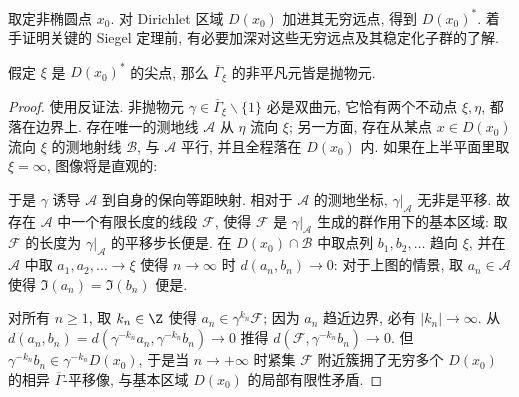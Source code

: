 取定非椭圆点 $x_0$. 对 Dirichlet 区域 $D(x_0)$ 加进其无穷远点, 得到 $D(x_0)^*$. 着手证明关键的 Siegel 定理前, 有必要加深对这些无穷远点及其稳定化子群的了解.
\begin{lemma}\label{prop:parabolic-stabilizer-aux}
	假定 $\xi$ 是 $D(x_0)^*$ 的尖点, 那么 $\overline{\Gamma}_\xi$ 的非平凡元皆是抛物元.
\end{lemma}
\begin{proof}
	使用反证法. 非抛物元 $\gamma \in \overline{\Gamma}_\xi \smallsetminus \{1\}$ 必是双曲元, 它恰有两个不动点 $\xi, \eta$, 都落在边界上. 存在唯一的测地线 $\mathcal{A}$ 从 $\eta$ 流向 $\xi$; 另一方面, 存在从某点 $x \in D(x_0)$ 流向 $\xi$ 的测地射线 $\mathcal{B}$, 与 $\mathcal{A}$ 平行, 并且全程落在 $D(x_0)$ 内. 如果在上半平面里取 $\xi = \infty$, 图像将是直观的:
	\begin{center}\end{center}

	于是 $\gamma$ 诱导 $\mathcal{A}$ 到自身的保向等距映射. 相对于 $\mathcal{A}$ 的测地坐标, $\gamma|_{\mathcal{A}}$ 无非是平移. 故存在 $\mathcal{A}$ 中一个有限长度的线段 $\mathcal{F}$, 使得 $\mathcal{F}$ 是 $\gamma|_{\mathcal{A}}$ 生成的群作用下的基本区域: 取 $\mathcal{F}$ 的长度为 $\gamma|_{\mathcal{A}}$ 的平移步长便是. 在 $D(x_0) \cap \mathcal{B}$ 中取点列 $b_1, b_2, \ldots$ 趋向 $\xi$, 并在 $\mathcal{A}$ 中取 $a_1, a_2, \ldots \to \xi$ 使得 $n \to \infty$ 时 $d(a_n, b_n) \to 0$: 对于上图的情景, 取 $a_n \in \mathcal{A}$ 使得 $\Im(a_n) = \Im(b_n)$ 便是.
	
	对所有 $n \geq 1$, 取 $k_n \in \Z$ 使得 $a_n \in \gamma^{k_n} \mathcal{F}$; 因为 $a_n$ 趋近边界, 必有 $|k_n| \to \infty$. 从 $d(a_n, b_n) = d\left( \gamma^{-k_n} a_n, \gamma^{-k_n} b_n \right) \to 0$ 推得 $d\left(\mathcal{F}, \gamma^{-k_n} b_n \right) \to 0$. 但 $\gamma^{-k_n} b_n \in \gamma^{-k_n} D(x_0)$, 于是当 $n \to +\infty$ 时紧集 $\mathcal{F}$ 附近簇拥了无穷多个 $D(x_0)$ 的相异 $\overline{\Gamma}$-平移像, 与基本区域 $D(x_0)$ 的局部有限性矛盾.
\end{proof}

